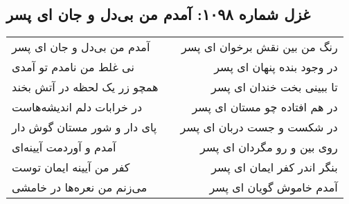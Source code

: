 \begin{center}
\section*{غزل شماره ۱۰۹۸: آمدم من بی‌دل و جان ای پسر}
\label{sec:1098}
\begin{longtable}{l p{0.5cm} r}
آمدم من بی‌دل و جان ای پسر
&&
رنگ من بین نقش برخوان ای پسر
\\
نی غلط من نامدم تو آمدی
&&
در وجود بنده پنهان ای پسر
\\
همچو زر یک لحظه در آتش بخند
&&
تا ببینی بخت خندان ای پسر
\\
در خرابات دلم اندیشه‌هاست
&&
در هم افتاده چو مستان ای پسر
\\
پای دار و شور مستان گوش دار
&&
در شکست و جست دربان ای پسر
\\
آمدم و آوردمت آیینه‌ای
&&
روی بین و رو مگردان ای پسر
\\
کفر من آیینه ایمان توست
&&
بنگر اندر کفر ایمان ای پسر
\\
می‌زنم من نعره‌ها در خامشی
&&
آمدم خاموش گویان ای پسر
\\
\end{longtable}
\end{center}
